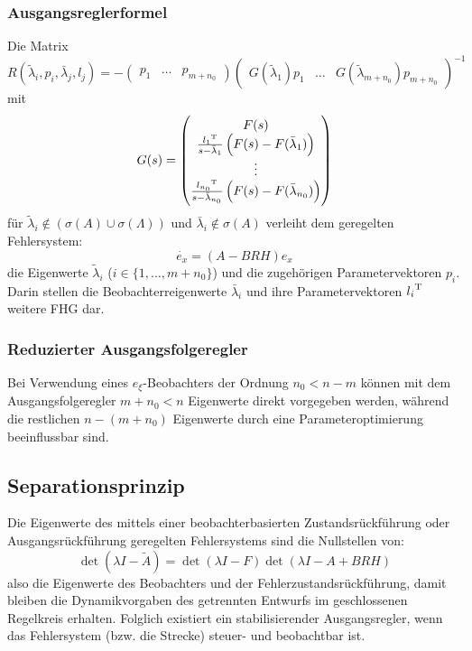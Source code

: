 \subsubsection{Ausgangsreglerformel}
Die Matrix
\begin{equation}
    R(\tilde{\lambda}_i, p_i, \bar{\lambda}_j, l_j) = -
        \begin{pmatrix} p_1 & \ldots & p_{m+n_0} \end{pmatrix}
        {\begin{pmatrix} G(\tilde{\lambda}_1) p_1 & \ldots &
        G(\tilde{\lambda}_{m+n_0})p_{m+n_0} \end{pmatrix}}^{-1}
\end{equation}
mit
\begin{equation}
    G(s) = \begin{pmatrix}
            F(s) \\
            \frac{{l_1}^\text{T}}{s-\bar{\lambda}_1} \left(F(s) - F(\bar{\lambda}_1)\right) \\
            \vdots \\
            \frac{{l_{n_0}}^\text{T}}{s-\bar{\lambda}_{n_0}} \left(F(s) - F(\bar{\lambda}_{n_0})\right)
        \end{pmatrix}
\end{equation}
für $\tilde{\lambda}_i \notin \left(\sigma(A) \cup \sigma(\Lambda)\right)$ und
$\bar{\lambda}_i \notin \sigma(A)$ verleiht dem geregelten Fehlersystem:
\begin{equation}
    \dot{e_x} = (A-BRH) e_x
\end{equation}
die Eigenwerte $\tilde{\lambda}_i$ ($i \in \{1, \ldots, m+n_0\}$) und die zugehörigen 
Parametervektoren $p_i$. Darin stellen die Beobachterreigenwerte $\bar{\lambda}_i$ und
ihre Parametervektoren ${l_i}^\text{T}$ weitere FHG dar.

\subsubsection{Reduzierter Ausgangsfolgeregler}
Bei Verwendung eines $e_\xi$-Beobachters der Ordnung $n_0 < n-m$ können mit dem 
Ausgangsfolgeregler $m+n_0<n$ Eigenwerte direkt vorgegeben werden, während die restlichen
$n-(m+n_0)$ Eigenwerte durch eine Parameteroptimierung beeinflussbar sind.

\subsection{Separationsprinzip}
Die Eigenwerte des mittels einer beobachterbasierten Zustandsrückführung oder
Ausgangsrückführung geregelten Fehlersystems sind die Nullstellen von:
\begin{equation}
    \det (\lambda I - \tilde{A}) = \det(\lambda I - F) \det(\lambda I - A + BRH)
\end{equation}
also die Eigenwerte des Beobachters und der Fehlerzustandsrückführung, damit bleiben
die Dynamikvorgaben des getrennten Entwurfs im geschlossenen Regelkreis erhalten.
Folglich existiert ein stabilisierender Ausgangsregler, wenn das Fehlersystem (bzw.
die Strecke) steuer- und beobachtbar ist.

